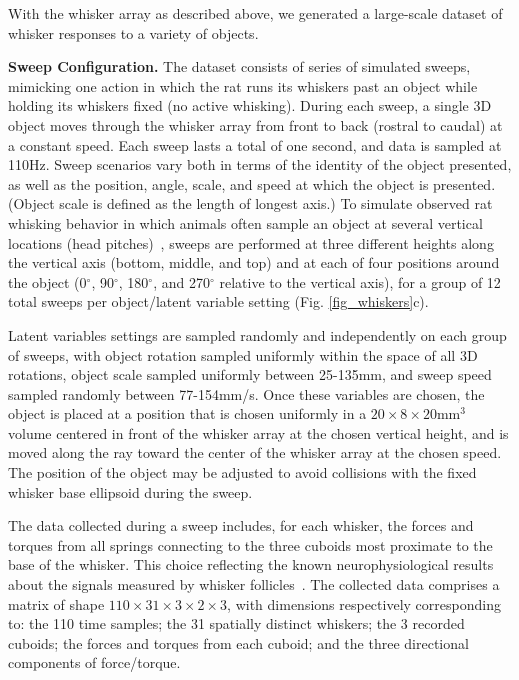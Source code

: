 With the whisker array as described above, we generated a large-scale dataset of whisker responses to a variety of objects.   

\textbf{Sweep Configuration.}  The dataset consists of series of simulated sweeps, mimicking one action in which the rat runs its whiskers past an object while holding its whiskers fixed (no active whisking).   
During each sweep, a single 3D object moves through the whisker array from front to back (rostral to caudal) at a constant speed.  
Each sweep lasts a total of one second, and data is sampled at 110Hz. 
Sweep scenarios vary both in terms of the identity of the object presented, as well as the position, angle, scale, and speed at which the object is presented.   
(Object scale is defined as the length of longest axis.)
To simulate observed rat whisking behavior in which animals often sample an object at several vertical locations (head pitches)~\cite{hobbs2015spatiotemporal}, sweeps are performed at three different heights along the vertical axis (bottom, middle, and top) and at each of four positions around the object (0$^{\circ}$, 90$^{\circ}$, 180$^{\circ}$, and 270$^{\circ}$ relative to the vertical axis), for a group of 12 total sweeps per object/latent variable setting (Fig. \ref{fig_whiskers}c). 

Latent variables settings are sampled randomly and independently on each group of sweeps, with object rotation sampled uniformly within the space of all 3D rotations, object scale sampled uniformly between 25-135mm, and sweep speed sampled randomly between 77-154mm/s.  
Once these variables are chosen, the object is placed at a position that is chosen uniformly in a  $20 \times 8 \times 20$mm$^{3}$ volume centered in front of the whisker array at the chosen vertical height, and is moved along the ray toward the center of the whisker array at the chosen speed. 
The position of the object may be adjusted to avoid collisions with the fixed whisker base ellipsoid during the sweep. 

The data collected during a sweep includes, for each whisker, the forces and torques from all springs connecting to the three cuboids most proximate to the base of the whisker.  This choice reflecting the known neurophysiological results about the signals measured by whisker follicles~\cite{Quist2014, Huet2016}.  
The collected data comprises a matrix of shape $110 \times 31 \times 3 \times 2 \times 3$, with dimensions respectively corresponding to: the 110 time samples;  the 31 spatially distinct whiskers; the 3 recorded cuboids; the forces and torques from each cuboid; and the three directional components of force/torque.   


